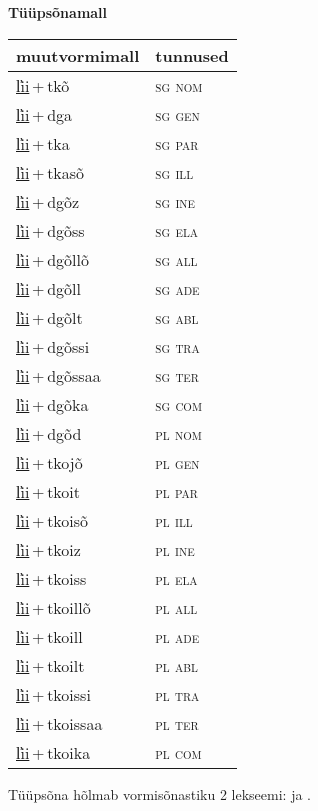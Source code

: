
\vspace{1.8em}
\begin{minipage}{\textwidth}
\textbf{Tüüpsõnamall \,}\\

\begin{sideways}
\begin{tabular}{l l}
muutvormimall & tunnused \\
\hline
\underline{l̕ii}\,+\,tkõ & \textsc{ sg nom } \\
\underline{l̕ii}\,+\,dga & \textsc{ sg gen } \\
\underline{l̕ii}\,+\,tka & \textsc{ sg par } \\
\underline{l̕ii}\,+\,tkasõ & \textsc{ sg ill } \\
\underline{l̕ii}\,+\,dgõz & \textsc{ sg ine } \\
\underline{l̕ii}\,+\,dgõss & \textsc{ sg ela } \\
\underline{l̕ii}\,+\,dgõllõ & \textsc{ sg all } \\
\underline{l̕ii}\,+\,dgõll & \textsc{ sg ade } \\
\underline{l̕ii}\,+\,dgõlt & \textsc{ sg abl } \\
\underline{l̕ii}\,+\,dgõssi & \textsc{ sg tra } \\
\underline{l̕ii}\,+\,dgõssaa & \textsc{ sg ter } \\
\underline{l̕ii}\,+\,dgõka & \textsc{ sg com } \\
\underline{l̕ii}\,+\,dgõd & \textsc{ pl nom } \\
\underline{l̕ii}\,+\,tkojõ & \textsc{ pl gen } \\
\underline{l̕ii}\,+\,tkoit & \textsc{ pl par } \\
\underline{l̕ii}\,+\,tkoisõ & \textsc{ pl ill } \\
\underline{l̕ii}\,+\,tkoiz & \textsc{ pl ine } \\
\underline{l̕ii}\,+\,tkoiss & \textsc{ pl ela } \\
\underline{l̕ii}\,+\,tkoillõ & \textsc{ pl all } \\
\underline{l̕ii}\,+\,tkoill & \textsc{ pl ade } \\
\underline{l̕ii}\,+\,tkoilt & \textsc{ pl abl } \\
\underline{l̕ii}\,+\,tkoissi & \textsc{ pl tra } \\
\underline{l̕ii}\,+\,tkoissaa & \textsc{ pl ter } \\
\underline{l̕ii}\,+\,tkoika & \textsc{ pl com } \\
\end{tabular}
\end{sideways}
\label{tab:tüüpsõnamall-l̕iitkõ}

\end{minipage}

 
\vspace{1em}
\noindent Tüüpsõna hõlmab vormisõnastiku 2 lekseemi:  ja .
